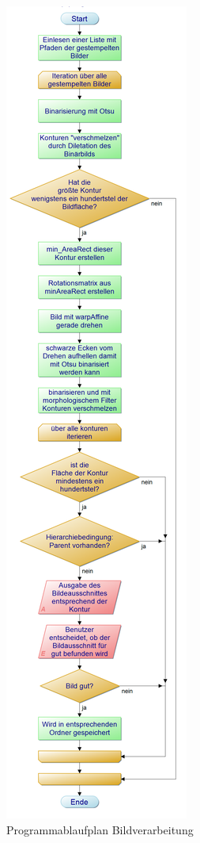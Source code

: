 \documentclass[12pt,toc=bib,toc=listof]{scrreprt}
\begin{document}
\begin{figure}[h]
\begin{minipage}[t]{.33\linewidth}
  \includegraphics[width=\linewidth]{./../bilder/BV_pap}
  \caption{Programmablaufplan Bildverarbeitung}
  \label{fig:bv_pap}
\end{minipage}
\end{figure}
\end{document}
